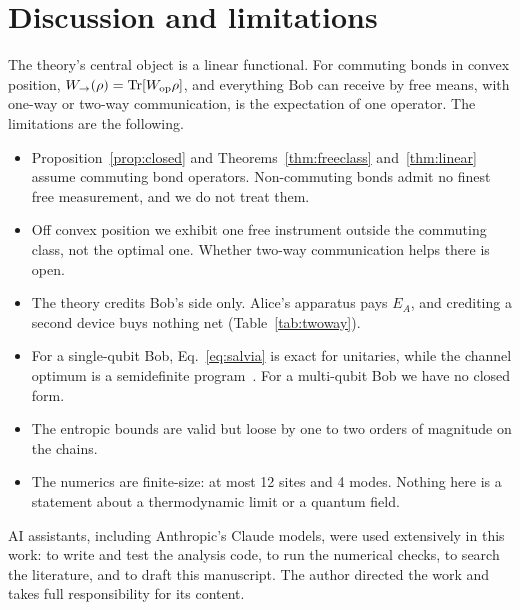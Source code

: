 \documentclass[aps,pra,twocolumn,reprint,superscriptaddress,nofootinbib,floatfix]{revtex4-2}
\theoremstyle{plain}
\theoremstyle{remark}
\newcommand{\Tr}{\operatorname{Tr}}
\newcommand{\Wto}{W_{\to}}
\begin{document}
\section{Discussion and limitations}
\label{sec:discussion}

The theory's central object is a linear functional. For commuting bonds in convex
position, $\Wto(\rho)=\Tr[W_{\rm op}\rho]$, and everything Bob can receive by free means,
with one-way or two-way communication, is the expectation of one operator. The limitations
are the following.
\begin{itemize}\setlength{\itemsep}{1pt}\setlength{\parskip}{0pt}
\item Proposition~\ref{prop:closed} and Theorems~\ref{thm:freeclass} and~\ref{thm:linear}
assume commuting bond operators. Non-commuting bonds admit no finest free measurement, and we
do not treat them.
\item Off convex position we exhibit one free instrument outside the commuting class, not the
optimal one. Whether two-way communication helps there is open.
\item The theory credits Bob's side only. Alice's apparatus pays $E_A$, and crediting a second
device buys nothing net (Table~\ref{tab:twoway}).
\item For a single-qubit Bob, Eq.~\eqref{eq:salvia} is exact for unitaries, while the channel
optimum is a semidefinite program~\cite{Alhambra2019}. For a multi-qubit Bob we have no closed
form.
\item The entropic bounds are valid but loose by one to two orders of magnitude on the chains.
\item The numerics are finite-size: at most 12 sites and 4 modes. Nothing here is a
statement about a thermodynamic limit or a quantum field.
\end{itemize}

\begin{acknowledgments}
AI assistants, including Anthropic's Claude models, were used extensively in this work: to
write and test the analysis code, to run the numerical checks, to search the literature, and
to draft this manuscript. The author directed the work and takes full responsibility for its
content.
\end{acknowledgments}

\appendix
\end{document}
